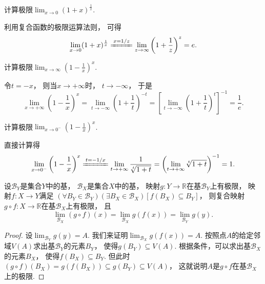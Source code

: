 \begin{example}
计算极限\(\lim_{x\to0} (1+x)^{\frac1x}\).
\begin{solution}
利用复合函数的极限运算法则，
可得\[
	\lim_{x\to0} (1+x)^{\frac1x}
	\xlongequal{x=1/z}
	\lim_{z\to\infty} \left(1+\frac1z\right)^z
	= e.
\]
\end{solution}
\end{example}

\begin{example}
计算极限\(\lim_{x\to\infty} \left(1-\frac1x\right)^x\).
\begin{solution}
令\(t = -x\)，
则当\(x \to +\infty\)时，
\(t \to -\infty\)，
于是\[
	\lim_{x\to+\infty} \left(1-\frac1x\right)^x
	= \lim_{t\to-\infty} \left(1+\frac1t\right)^{-t}
	= \left[\lim_{t\to-\infty} \left(1+\frac1t\right)^t\right]^{-1}
	= \frac1e.
\]
\end{solution}
\end{example}

\begin{example}
计算极限\(\lim_{x\to0^-} \left(1-\frac1x\right)^x\).
\begin{solution}
直接计算得\[
	\lim_{x\to0^-} \left(1-\frac1x\right)^x
	\xlongequal{t=-1/x} \lim_{t\to+\infty} \frac{1}{\sqrt[t]{1+t}}
	= \left(\lim_{t\to+\infty} \sqrt[t]{1+t}\right)^{-1}
	= 1.
\]
\end{solution}
\end{example}

\begin{theorem}
设\(\mathcal{B}_Y\)是集合\(Y\)中的基，
\(\mathcal{B}_X\)是集合\(X\)中的基，
映射\(g\colon Y\to\mathbb{R}\)在基\(\mathcal{B}_Y\)上有极限，
映射\(f\colon X\to Y\)满足
\((\forall B_Y\in\mathcal{B}_Y)
(\exists B_X\in\mathcal{B}_X)
[f(B_X) \subseteq B_Y]\)，
则复合映射\(g \circ f\colon X\to\mathbb{R}\)在基\(\mathcal{B}_X\)上有极限，
且\[
	\lim_{\mathcal{B}_X} (g \circ f)(x)
	= \lim_{\mathcal{B}_X} g(f(x))
	= \lim_{\mathcal{B}_Y} g(y).
\]
\begin{proof}
设\(\lim_{\mathcal{B}_Y} g(y) = A\).
我们来证明\(\lim_{\mathcal{B}_X} g(f(x)) = A\).
按照点\(A\)的给定邻域\(V(A)\)求出基\(\mathcal{B}_Y\)的元素\(B_Y\)，
使得\(g(B_Y) \subseteq V(A)\).
根据条件，可以求出基\(\mathcal{B}_X\)的元素\(B_X\)，
使得\(f(B_X) \subseteq B_Y\).
但此时\((g \circ f)(B_X) = g(f(B_X)) \subseteq g(B_Y) \subseteq V(A)\)，
这就说明\(A\)是\(g \circ f\)在基\(\mathcal{B}_X\)上的极限.
\end{proof}
\end{theorem}
